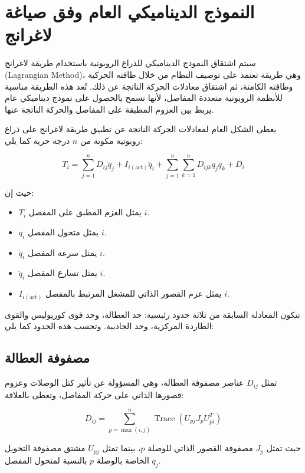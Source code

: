 \section{النموذج الديناميكي العام وفق صياغة لاغرانج}

سيتم اشتقاق النموذج الديناميكي للذراع الروبوتية باستخدام طريقة لاغرانج 
\textenglish{(Lagrangian Method)}، وهي طريقة تعتمد على توصيف النظام من خلال طاقته الحركية وطاقته الكامنة، ثم اشتقاق معادلات الحركة الناتجة عن ذلك. تُعد هذه الطريقة مناسبة للأنظمة الروبوتية متعددة المفاصل، لأنها تسمح بالحصول على نموذج ديناميكي عام يربط بين العزوم المطبقة على المفاصل والحركة الناتجة عنها.

يعطى الشكل العام لمعادلات الحركة الناتجة عن تطبيق طريقة لاغرانج على ذراع روبوتية مكونة من $n$ درجة حرية كما يلي:

\begin{equation}
T_i =
\sum_{j=1}^{n} D_{ij}\ddot{q}_j
+
I_{i(\mathrm{act})}\ddot{q}_i
+
\sum_{j=1}^{n}\sum_{k=1}^{n}
D_{ijk}\dot{q}_j\dot{q}_k
+
D_i
\end{equation}

حيث إن:

\begin{itemize}
    \item $T_i$ يمثل العزم المطبق على المفصل $i$.
    \item $q_i$ يمثل متحول المفصل $i$.
    \item $\dot{q}_i$ يمثل سرعة المفصل $i$.
    \item $\ddot{q}_i$ يمثل تسارع المفصل $i$.
    \item $I_{i(\mathrm{act})}$ يمثل عزم القصور الذاتي للمشغل المرتبط بالمفصل $i$.
\end{itemize}

تتكون المعادلة السابقة من ثلاثة حدود رئيسية: حد العطالة، وحد قوى كوريوليس والقوى الطاردة المركزية، وحد الجاذبية. وتحسب هذه الحدود كما يلي:

\subsection{مصفوفة العطالة}

تمثل $D_{ij}$ عناصر مصفوفة العطالة، وهي المسؤولة عن تأثير كتل الوصلات وعزوم قصورها الذاتي على حركة المفاصل، وتعطى بالعلاقة:

\begin{equation}
D_{ij} =
\sum_{p=\max(i,j)}^{n}
\operatorname{Trace}
\left(
U_{pj} J_p U_{pi}^{T}
\right)
\end{equation}

حيث تمثل $J_p$ مصفوفة القصور الذاتي للوصلة $p$، بينما تمثل $U_{pj}$ مشتق مصفوفة التحويل الخاصة بالوصلة $p$ بالنسبة لمتحول المفصل $q_j$.

